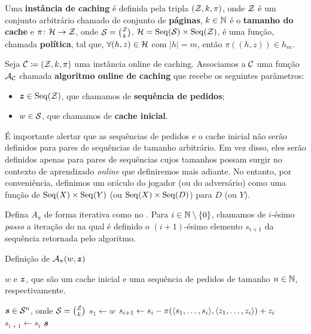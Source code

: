 \begin{definition}
  \label{def:cache}
  Uma \textbf{instância de caching} é definida pela tripla \((\mathcal{Z}, k, \pi) \), onde \(\mathcal{Z}\) é um conjunto arbitrário chamado de conjunto de \textbf{páginas}, \(k \in \mathbb{N}\) é o \textbf{tamanho do cache} e \(\pi \colon \mathcal{H} \to \mathcal{Z}\), onde \(\mathcal{S} = \binom{\mathcal{Z}}{k}\), \(\mathcal{H} = \operatorname{Seq}(\mathcal{S}) \times \operatorname{Seq}(\mathcal{Z}) \), é uma função, chamada \textbf{política}, tal que, \(\forall (h,z) \in \mathcal{H}\) com \(|h| = m\), então \(\pi((h,z)) \in h_m\).
\end{definition}

Seja \(\mathcal{C} \coloneq (\mathcal{Z}, k, \pi)\) uma instância online de caching. Associamos a \(\mathcal{C}\) uma função \(\mathcal{A}_{\mathcal{C}}\) chamada \textbf{algoritmo online de caching} que recebe os seguintes parâmetros:
  \begin{itemize}
    \item \(\bm{z} \in \operatorname{Seq}(\mathcal{Z})\), que chamamos de \textbf{sequência de pedidos};
    \item \(w \in \mathcal{S}\), que chamamos de \textbf{cache inicial}.
  \end{itemize}

É importante alertar que as sequências de pedidos e o cache inicial não serão definidos para pares de sequências de tamanho arbitrário. Em vez disso, eles serão definidos apenas para pares de sequências cujos tamanhos possam surgir no contexto de aprendizado \emph{online} que definiremos mais adiante. No entanto, por conveniência, definimos um oráculo do jogador (ou do adversário) como uma função de \(\operatorname{Seq}(X) \times \operatorname{Seq}(Y)\) (ou \(\operatorname{Seq}(X) \times \operatorname{Seq}(D)\)) para \(D\) (ou \(Y\)).

Defina \(A_\pi\) de forma iterativa como no . Para \(i \in \mathbb{N} \setminus \{0\}\), chamamos de \(i\)-ésimo \emph{passo} a iteração do  na qual é definido o \((i+1)\)-ésimo elemento \(s_{i+1}\) da sequência retornada pelo algoritmo.

\begin{algorithm}
  \caption{Definição de \(\mathcal{A}_\pi(w, \bm{z})\)}
  \label{algo:cache}
  \begin{algorithmic}[1]
    \Require \(w\) e \(\bm{z}\), que são um cache inicial e uma sequência de pedidos de tamanho \(n \in \mathbb{N}\), respectivamente.

    \Ensure \(\bm{s} \in \mathcal{S}^n\), onde \(\mathcal{S} = \binom{\mathcal{Z}}{k}\)
    \State \(s_1 \gets w\)
    \State \(s_{i+1} \gets s_{i} - \pi(\langle s_1, \dotsc, s_{i}\rangle, \langle z_1, \dotsc, z_{i}\rangle) + z_i \) \label{linha}
    \Else
    \State \(s_{i+1} \gets s_i\)
    \EndIf
    \EndFor
    \State \Return \(\bm{s}\)
  \end{algorithmic}
\end{algorithm}

